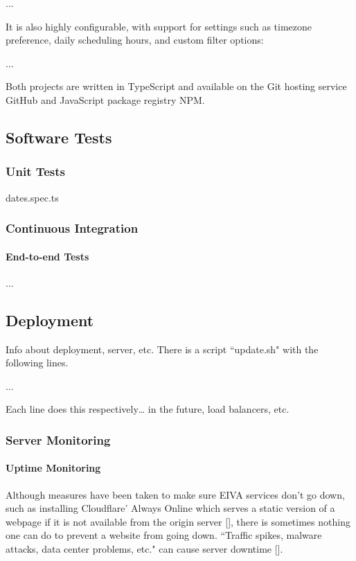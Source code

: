 \documentclass{article}
\begin{document}
...

It is also highly configurable, with support for settings such as timezone preference, daily scheduling hours, and custom filter options:

...

Both projects are written in TypeScript and available on the Git hosting service GitHub and JavaScript package registry NPM.

\subsection{Software Tests}

\subsubsection{Unit Tests}

dates.spec.ts

\subsubsection{Continuous Integration}

\paragraph{End-to-end Tests} ...

\subsection{Deployment}

Info about deployment, server, etc. There is a script ``update.sh" with the following lines.

...


Each line does this respectively… in the future, load balancers, etc.

\subsubsection{Server Monitoring}

\paragraph{Uptime Monitoring}

Although measures have been taken to make sure EIVA services don't go down, such as installing Cloudflare' Always Online which serves a static version of a webpage if it is not available from the origin server [], there is sometimes nothing one can do to prevent a website from going down. ``Traffic spikes, malware attacks, data center problems, etc." can cause server downtime [].
\end{document}
